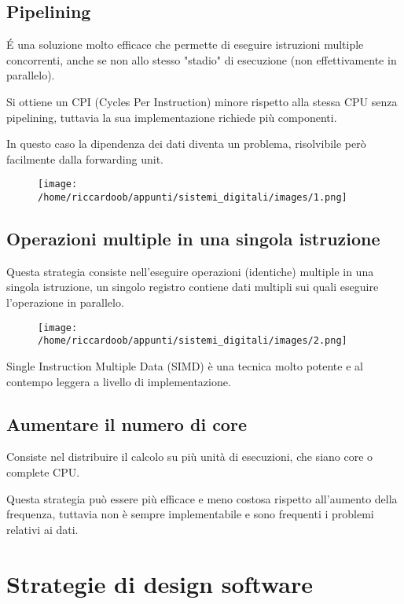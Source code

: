 \subsection{Pipelining}
É una soluzione molto efficace che permette di eseguire istruzioni multiple concorrenti, anche se non allo stesso "stadio" di esecuzione (non effettivamente in parallelo).

Si ottiene un CPI (Cycles Per Instruction) minore rispetto alla stessa CPU senza pipelining, tuttavia la sua implementazione richiede più componenti.

In questo caso la dipendenza dei dati diventa un problema, risolvibile però facilmente dalla forwarding unit.

\begin{figure}[H]
    \centering
    \texttt{[image: /home/riccardoob/appunti/sistemi\_digitali/images/1.png]}
\end{figure}

\subsection{Operazioni multiple in una singola istruzione}
Questa strategia consiste nell'eseguire operazioni (identiche) multiple in una singola istruzione, un singolo registro contiene dati multipli sui quali eseguire l'operazione in parallelo.

\begin{figure}[H]
    \centering
    \texttt{[image: /home/riccardoob/appunti/sistemi\_digitali/images/2.png]}
\end{figure}

Single Instruction Multiple Data (SIMD) è una tecnica molto potente e al contempo leggera a livello di implementazione.

\subsection{Aumentare il numero di core}
Consiste nel distribuire il calcolo su più unità di esecuzioni, che siano core o complete CPU.

Questa strategia può essere più efficace e meno costosa rispetto all'aumento della frequenza, tuttavia non è sempre implementabile e sono frequenti i problemi relativi ai dati. 

\section{Strategie di design software}


